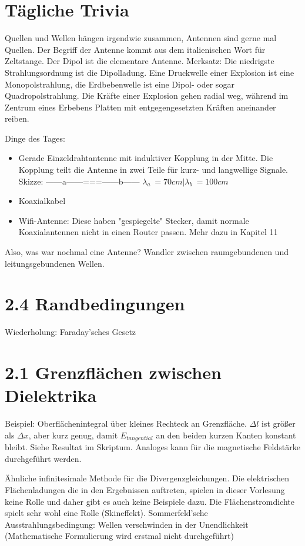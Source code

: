 \documentclass[a4paper]{article}
\begin{document}
\section*{Tägliche Trivia}
Quellen und Wellen hängen irgendwie zusammen, Antennen sind gerne mal Quellen.
Der Begriff der Antenne kommt aus dem italienischen Wort für Zeltstange.
Der Dipol ist die elementare Antenne.\newline
Merksatz: Die niedrigste Strahlungsordnung ist die Dipolladung.
Eine Druckwelle einer Explosion ist eine Monopolstrahlung, die Erdbebenwelle ist
eine Dipol- oder sogar Quadropolstrahlung.
Die Kräfte einer Explosion gehen radial weg, während im Zentrum eines Erbebens
Platten mit entgegengesetzten Kräften aneinander reiben.\newline

Dinge des Tages:
\begin{itemize}
    \item Gerade Einzeldrahtantenne mit induktiver Kopplung in der Mitte. Die Kopplung teilt die Antenne in zwei Teile für kurz- und langwellige Signale.\newline
       Skizze: ------a------===------b------
                $\lambda_{a}~=70cm | \lambda_{b}~=100cm$
    \item Koaxialkabel
    \item Wifi-Antenne: Diese haben "gespiegelte" Stecker, damit normale Koaxialantennen nicht in einen Router passen. Mehr dazu in Kapitel 11
\end{itemize}

Also, was war nochmal eine Antenne? Wandler zwischen raumgebundenen und leitungsgebundenen Wellen.

\section*{2.4 Randbedingungen}
Wiederholung: Faraday'sches Gesetz

\section*{2.1 Grenzflächen zwischen Dielektrika}
Beispiel: Oberflächenintegral über kleines Rechteck an Grenzfläche.
$\Delta l$ ist größer als $\Delta x$, aber kurz genug, damit $E_{tangential}$ an den beiden kurzen Kanten konstant bleibt. Siehe Resultat im Skriptum.
Analoges kann für die magnetische Feldstärke durchgeführt werden.\newline

Ähnliche infinitesimale Methode für die Divergenzgleichungen.
Die elektrischen Flächenladungen die in den Ergebnissen auftreten, spielen in
dieser Vorlesung keine Rolle und daher gibt es auch keine Beispiele dazu.
Die Flächenstromdichte spielt sehr wohl eine Rolle (Skineffekt).\newline\newline
Sommerfeld'sche Ausstrahlungsbedingung: Wellen verschwinden in der Unendlichkeit\newline
(Mathematische Formulierung wird erstmal nicht durchgeführt)
\end{document}
